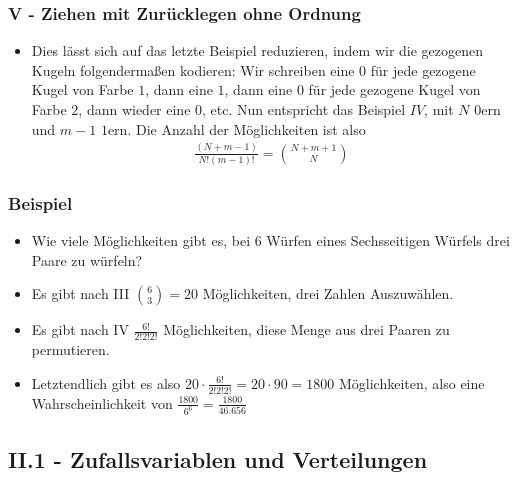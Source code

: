 \documentclass{scrartcl}
\begin{document}
\subsubsection*{V - Ziehen mit Zurücklegen ohne Ordnung}
\begin{itemize}
    \item Dies lässt sich auf das letzte Beispiel reduzieren, indem wir die gezogenen Kugeln folgendermaßen kodieren: Wir schreiben eine $0$ für jede gezogene Kugel von Farbe $1$, dann eine $1$, dann eine $0$ für jede gezogene Kugel von Farbe $2$, dann wieder eine $0$, etc. Nun entspricht das Beispiel $IV$, mit $N$ $0$ern und $m-1$ $1$ern. Die Anzahl der Möglichkeiten ist also
    \begin{align*}
        \frac{(N+m-1)}{N!(m-1)!} = \binom{N+m+1}{N}
    \end{align*}
\end{itemize}
\subsubsection*{Beispiel}
\begin{itemize}
    \item Wie viele Möglichkeiten gibt es, bei 6 Würfen eines Sechsseitigen Würfels drei Paare zu würfeln?
    \item Es gibt nach III $\binom{6}{3} = 20$ Möglichkeiten, drei Zahlen Auszuwählen.
    \item Es gibt nach IV $\frac{6!}{2!2!2!}$ Möglichkeiten, diese Menge aus drei Paaren zu permutieren.
    \item Letztendlich gibt es also $20 \cdot \frac{6!}{2!2!2!} = 20 \cdot 90 = 1800$ Möglichkeiten, also eine Wahrscheinlichkeit von $\frac{1800}{6^6} = \frac{1800}{46.656}$
\end{itemize}
\subsection*{II.1 - Zufallsvariablen und Verteilungen}
\end{document}
